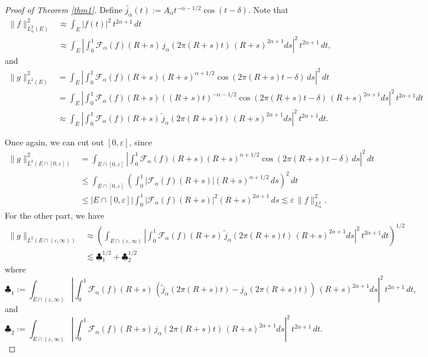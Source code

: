 \documentclass[11pt,a4paper,reqno,dvipsnames]{amsart}
\newcommand{\ep}{\varepsilon}
\renewcommand{\le}{\leqslant}
\numberwithin{equation}{section}
\theoremstyle{plain}
\theoremstyle{definition}
\theoremstyle{remark}
\begin{document}
\begin{proof}[Proof of Theorem \ref{thm1}]
Define $\widetilde{j_\alpha}(t) := A_\alpha t^{-\alpha-1/2} \cos(t-\delta)$. Note that 
\begin{align*}
    \|f\|^2_{L^2_\alpha(E)} &\approx \int_E |f(t)|^2\, t^{2\alpha + 1}\, dt\\
    &\approx \int_E \left|\int_0^1 \mathcal{F}_\alpha(f)(R+s)\,  j_\alpha(2\pi (R+s)t)\, (R+s)^{2\alpha + 1} ds\right|^2 \, t^{2\alpha + 1}\, dt,
\end{align*}
and
\begin{align*}
    \|g\|^2_{L^2(E)} &= \int_E \left|\int_0^1 \mathcal{F}_\alpha(f)(R+s) (R+s)^{\alpha+1/2} \cos(2\pi (R+s)t-\delta)\, ds\right|^2 \, dt\\
    &= \int_E \left|\int_0^1 \mathcal{F}_\alpha(f)(R+s) ((R+s)t)^{-\alpha-1/2} \cos(2\pi (R+s)t-\delta)\, (R+s)^{2\alpha + 1} ds\right|^2 \, t^{2\alpha + 1} dt\\
    &\approx \int_E \left|\int_0^1 \mathcal{F}_\alpha(f)(R+s) \, \widetilde{j}_\alpha(2\pi (R+s)t)\, (R+s)^{2\alpha + 1} ds\right|^2 \, t^{2\alpha + 1} dt.
\end{align*}

Once again, we can cut out $[0, \ep]$, since
\begin{align*}
    \|g\|^2_{L^2(E \cap [0,\ep])} &= \int_{E \cap [0, \ep]} \left|\int_0^1 \mathcal{F}_\alpha(f)(R+s) (R+s)^{\alpha+1/2} \cos(2\pi (R+s)t-\delta)\, ds\right|^2 \, dt\\
    &\le \int_{E \cap [0, \ep]} \left(\int_0^1 |\mathcal{F}_\alpha(f)(R+s)| (R+s)^{\alpha+1/2}\, ds\right)^2 \, dt\\
    &\le |E \cap [0,\ep]| \int_0^1 |\mathcal{F}_\alpha(f)(R+s)|^2 (R+s)^{2\alpha+1}\, ds \lesssim \ep \, \|f\|^2_{L^2_\alpha}.
\end{align*}
For the other part, we have
\begin{align*}
    \|g\|_{L^2(E \cap (\ep,\infty))} &\approx \left(\int_{E \cap (\ep,\infty)} \left|\int_0^1 \mathcal{F}_\alpha(f)(R+s) \, \widetilde{j}_\alpha(2\pi (R+s)t)\, (R+s)^{2\alpha + 1} ds\right|^2 \, t^{2\alpha + 1} dt\right)^{1/2}\\
    &\lesssim \clubsuit_1^{1/2} + \clubsuit_2^{1/2}
\end{align*}
where 
$$\clubsuit_1 := \int_{E \cap (\ep,\infty)} \left|\int_0^1 \mathcal{F}_\alpha(f)(R+s)\,  (\widetilde{j}_\alpha(2\pi(R+s)t) - {j}_\alpha(2\pi(R+s)t))\, (R+s)^{2\alpha + 1} ds\right|^2 \, t^{2\alpha + 1}\, dt,$$
and
$$\clubsuit_2 := \int_{E \cap (\ep,\infty)} \left|\int_0^1 \mathcal{F}_\alpha(f)(R+s)\,  {j}_\alpha(2\pi(R+s)t)\, (R+s)^{2\alpha + 1} ds\right|^2 \, t^{2\alpha + 1}\, dt.$$


\end{proof}
\end{document}
